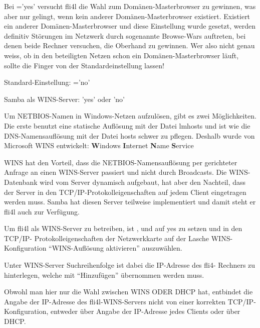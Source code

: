\begin{description}
    Bei ='yes' versucht fli4l die Wahl zum
    Domänen-Masterbrowser zu gewinnen, was aber nur gelingt, wenn kein anderer
    Domänen-Masterbrowser existiert. Existiert ein anderer Domänen-Masterbrowser
    und diese Einstellung wurde gesetzt, werden definitiv Störungen im Netzwerk
    durch sogenannte Browse-Wars auftreten, bei denen beide Rechner versuchen,
    die Oberhand zu gewinnen. Wer also nicht genau weiss, ob in den beteiligten
    Netzen schon ein Domänen-Masterbrowser läuft, sollte die Finger von der
    Standardeinstellung lassen!

    Standard-Einstellung: ='no'



    Samba als WINS-Server: 'yes' oder 'no'

    Um NETBIOS-Namen in Windows-Netzen aufzulösen, gibt es zwei
    Möglichkeiten. Die erste benutzt eine statische Auflösung mit der Datei
    lmhosts und ist wie die DNS-Namensauflösung mit der Datei hosts schwer
    zu pflegen. Deshalb wurde von Microsoft WINS entwickelt:
    \textbf{W}indows \textbf{I}nternet \textbf{N}ame \textbf{S}ervice

    WINS hat den Vorteil, dass die NETBIOS-Namensauflösung per gerichteter
    Anfrage an einen WINS-Server passiert und nicht durch Broadcasts. Die
    WINS-Datenbank wird vom Server dynamisch aufgebaut, hat aber den
    Nachteil, dass der Server in den TCP/IP-Protokolleigenschaften auf jedem
    Client eingetragen werden muss. Samba hat diesen Server teilweise
    implementiert und damit steht er fli4l auch zur Verfügung.

    Um fli4l als WINS-Server zu betreiben, ist ,  und
     auf yes zu setzen und in den TCP/IP-
    Protokolleigenschaften der Netzwerkkarte auf der Lasche WINS-Konfiguration
    ``WINS-Auflösung aktivieren'' auszuwählen.

    Unter WINS-Server Suchreihenfolge ist dabei die IP-Adresse des fli4-
    Rechners zu hinterlegen, welche mit ``Hinzufügen'' übernommen werden muss.

    Obwohl man hier nur die Wahl zwischen WINS ODER DHCP hat, entbindet die
    Angabe der IP-Adresse des fli4l-WINS-Servers nicht von einer korrekten
    TCP/IP-Konfiguration, entweder über Angabe der IP-Adresse jedes Clients
    oder über DHCP.


\end{description}
